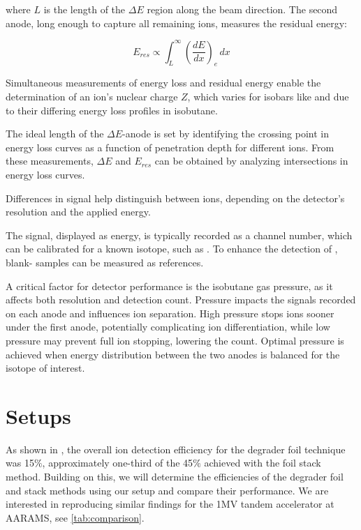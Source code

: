 where \( L \) is the length of the $\Delta E$ region along the beam direction. The second anode, long enough to capture all remaining ions, measures the residual energy:

\begin{equation}
    E_{res} \propto \int_L^\infty \left( \frac{dE}{dx} \right)_e \, dx
\end{equation}

Simultaneous measurements of energy loss and residual energy enable the determination of an ion’s nuclear charge \( Z \), which varies for isobars like  and  due to their differing energy loss profiles in isobutane.

The ideal length of the $\Delta E$-anode is set by identifying the crossing point in energy loss curves as a function of penetration depth for different ions. From these measurements, $\Delta E$ and \( E_{res} \) can be obtained by analyzing intersections in energy loss curves.

Differences in signal help distinguish between ions, depending on the detector's resolution and the applied energy.

The signal, displayed as energy, is typically recorded as a channel number, which can be calibrated for a known isotope, such as . To enhance the detection of , blank- samples can be measured as references.

A critical factor for detector performance is the isobutane gas pressure, as it affects both resolution and detection count. Pressure impacts the signals recorded on each anode and influences ion separation. High pressure stops ions sooner under the first anode, potentially complicating ion differentiation, while low pressure may prevent full ion stopping, lowering the count. Optimal pressure is achieved when energy distribution between the two anodes is balanced for the isotope of interest.


\section{Setups}
As shown in \cite{steier2019}, the overall ion detection efficiency for the degrader foil technique was 15$\%$, approximately one-third of the 45$\%$ achieved with the  foil stack method. Building on this, we will determine the efficiencies of the degrader foil and  stack methods using our setup and compare their performance. We are interested in reproducing similar findings for the 1MV tandem accelerator at AARAMS, see \cref{tab:comparison}.


